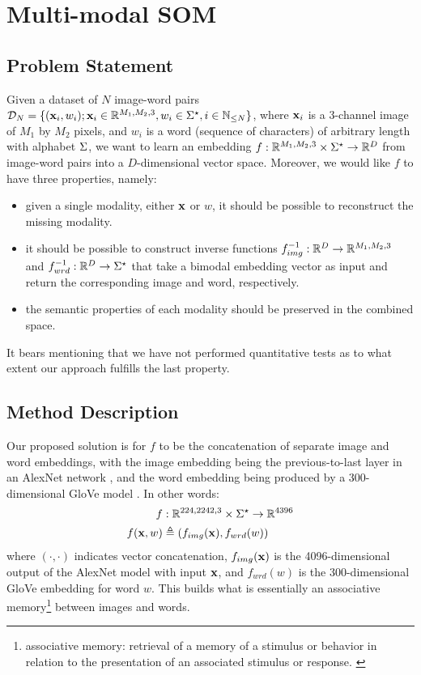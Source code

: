 \documentclass[a4paper]{standalone}
\begin{document}
\chapter{Multi-modal SOM}\label{chap:method}
\section{Problem Statement}
Given a dataset of $N$ image-word pairs $\mathcal{D}_N = \{(\mathbf{x}_i, w_i); \mathbf{x}_i \in \mathbb{R}^{M_1, M_2, 3}, w_i \in \Sigma^\star, i \in \mathbb{N}_{\leq N}\}$, where $\mathbf{x}_i$ is a 3-channel image of $M_1$ by $M_2$ pixels, and $w_i$ is a word (sequence of characters) of arbitrary length with alphabet $\Sigma$, we want to learn an embedding $f: \mathbb{R}^{M_1, M_2, 3} \times \Sigma^\star \rightarrow \mathbb{R}^{D}$ from image-word pairs into a $D$-dimensional vector space. Moreover, we would like $f$ to have three properties, namely:
\begin{itemize}
	\item given a single modality, either $\mathbf{x}$ or $w$, it should be possible to reconstruct the missing modality.
	\item it should be possible to construct inverse functions $f^{-1}_{img}: \mathbb{R}^{D} \rightarrow \mathbb{R}^{M_1, M_2, 3}$ and $f^{-1}_{wrd}: \mathbb{R}^{D} \rightarrow \Sigma^\star$ that take a bimodal embedding vector as input and return the corresponding image and word, respectively.
    \item the semantic properties of each modality should be preserved in the combined space.
\end{itemize}

It bears mentioning that we have not performed quantitative tests as to what extent our approach fulfills the last property.

\section{Method Description}
Our proposed solution is for $f$ to be the concatenation of separate image and word embeddings, with the image embedding being the previous-to-last layer in an AlexNet network \cite{krizhevsky2012imagenet}, and the word embedding being produced by a 300-dimensional GloVe model \cite{pennington2014glove}. In other words:
\begin{align*}
f              &: \mathbb{R}^{224, 2242, 3} \times \Sigma^\star \rightarrow \mathbb{R}^{4396} \\
f(\mathbf{x}, w)    &\triangleq (f_{img}(\mathbf{x}), f_{wrd}(w)) \\
\end{align*}
where $(\cdot, \cdot)$ indicates vector concatenation, $f_{img}(\mathbf{x})$ is the 4096-dimensional output of the AlexNet model with input $\mathbf{x}$, and $f_{wrd}(w)$ is the 300-dimensional GloVe embedding for word $w$. This builds what is essentially an associative memory\footnote{associative memory: retrieval of a memory of a stimulus or behavior in relation to the presentation of an associated stimulus or response. \cite{psychologydictionaryOrg}} between images and words.
\end{document}
